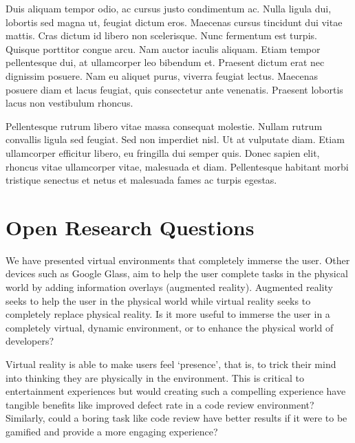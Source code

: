 \documentclass{acm_proc_article-sp}
\begin{document}
Duis aliquam tempor odio, ac cursus justo condimentum ac. Nulla ligula dui, lobortis sed magna ut, feugiat dictum eros. Maecenas cursus tincidunt dui vitae mattis. Cras dictum id libero non scelerisque. Nunc fermentum est turpis. Quisque porttitor congue arcu. Nam auctor iaculis aliquam. Etiam tempor pellentesque dui, at ullamcorper leo bibendum et. Praesent dictum erat nec dignissim posuere. Nam eu aliquet purus, viverra feugiat lectus. Maecenas posuere diam et lacus feugiat, quis consectetur ante venenatis. Praesent lobortis lacus non vestibulum rhoncus.

Pellentesque rutrum libero vitae massa consequat molestie. Nullam rutrum convallis ligula sed feugiat. Sed non imperdiet nisl. Ut at vulputate diam. Etiam ullamcorper efficitur libero, eu fringilla dui semper quis. Donec sapien elit, rhoncus vitae ullamcorper vitae, malesuada et diam. Pellentesque habitant morbi tristique senectus et netus et malesuada fames ac turpis egestas. 



\section{Open Research Questions}
We have presented virtual environments that completely immerse the user. Other devices such as Google Glass, aim to help the user complete tasks in the physical world by adding information overlays (augmented reality). Augmented reality seeks to help the user in the physical world while virtual reality seeks to completely replace physical reality. 
Is it more useful to immerse the user in a completely virtual, dynamic environment, or to enhance the physical world of developers?
  
Virtual reality is able to make users feel `presence', that is, to trick their mind into thinking they are physically in the environment. This is critical to entertainment experiences but would creating such a compelling experience have tangible benefits like improved defect rate in a code review environment? Similarly, could a boring task like code review have better results if it were to be gamified and provide a more engaging experience? 
\end{document}
